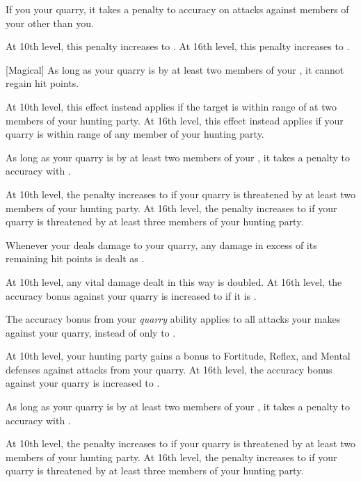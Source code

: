 {            
            If you  your quarry, it takes a  penalty to accuracy on attacks against members of your  other than you.
            \par At 10th level, this penalty increases to .
            At 16th level, this penalty increases to .

            [Magical]
            As long as your quarry is  by at least two members of your , it cannot regain hit points.
            \par At 10th level, this effect instead applies if the target is within \rngmed range of at two members of your hunting party.
            At 16th level, this effect instead applies if your quarry is within \rnglong range of any member of your hunting party.

            As long as your quarry is  by at least two members of your , it takes a  penalty to accuracy with .
            \par At 10th level, the penalty increases to  if your quarry is threatened by at least two members of your hunting party.
            At 16th level, the penalty increases to  if your quarry is threatened by at least three members of your hunting party.

            Whenever your  deals damage to your quarry, any damage in excess of its remaining hit points is dealt as .
            \par At 10th level, any vital damage dealt in this way is doubled.
            At 16th level, the accuracy bonus against your quarry is increased to  if it is .

            The accuracy bonus from your \textit{quarry} ability applies to all attacks your  makes against your quarry, instead of only to .
            \par At 10th level, your hunting party gains a  bonus to Fortitude, Reflex, and Mental defenses against attacks from your quarry.
            At 16th level, the accuracy bonus against your quarry is increased to .

            As long as your quarry is  by at least two members of your , it takes a  penalty to accuracy with .
            \par At 10th level, the penalty increases to  if your quarry is threatened by at least two members of your hunting party.
            At 16th level, the penalty increases to  if your quarry is threatened by at least three members of your hunting party.

}

